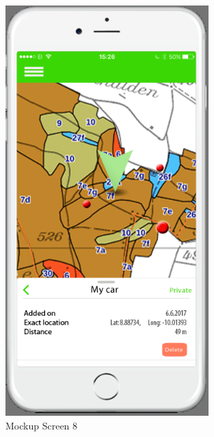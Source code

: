\begin{figure}[h]
\centering
    \includegraphics[width=0.7\textwidth]{mockup1-8}
    \caption{Mockup Screen 8}
    \label{fig:mesh8}
\end{figure}

